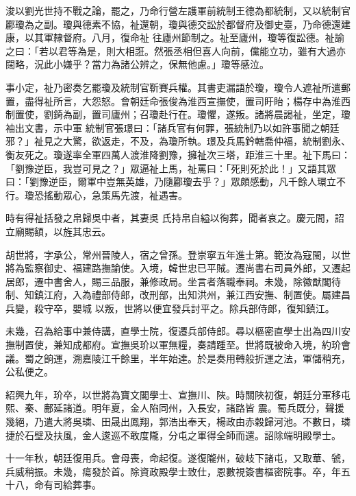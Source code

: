 \begin{pinyinscope}
 浚以劉光世持不戰之論，罷之，乃命行營左護軍前統制王德為都統制，又以統制官酈瓊為之副。瓊與德素不協，祉還朝，瓊與德交訟於都督府及御史臺，乃命德還建康，以其軍隸督府。八月，復命祉
 往廬州節制之。祉至廬州，瓊等復訟德。祉諭之曰：「若以君等為是，則大相誑。然張丞相但喜人向前，儻能立功，雖有大過亦闊略，況此小嫌乎？當力為諸公辨之，保無他慮。」瓊等感泣。



 事小定，祉乃密奏乞罷瓊及統制官靳賽兵權。其書吏漏語於瓊，瓊令人遮祉所遣郵置，盡得祉所言，大怨怒。會朝廷命張俊為淮西宣撫使，置司盱眙；楊存中為淮西制置使，劉錡為副，置司廬州；召瓊赴行在。瓊懼，遂叛。諸將晨謁祉，坐定，瓊袖出文書，示中軍
 統制官張璟曰：「諸兵官有何罪，張統制乃以如許事聞之朝廷邪？」祉見之大驚，欲返走，不及，為瓊所執。璟及兵馬鈐轄喬仲福，統制劉永、衡友死之。瓊遂率全軍四萬人渡淮降劉豫，擁祉次三塔，距淮三十里。祉下馬曰：「劉豫逆臣，我豈可見之？」眾逼祉上馬，祉罵曰：「死則死於此！」又語其眾曰：「劉豫逆臣，爾軍中豈無英雄，乃隨酈瓊去乎？」眾頗感動，凡千餘人環立不行。瓊恐搖動眾心，急策馬先渡，祉遇害。



 時有得祉括發之帛歸吳中者，其妻吳
 氏持帛自縊以徇葬，聞者哀之。慶元間，詔立廟賜額，以旌其忠云。



 胡世將，字承公，常州晉陵人，宿之曾孫。登崇寧五年進士第。範汝為寇閩，以世將為監察御史、福建路撫諭使。入境，韓世忠已平賊。遷尚書右司員外郎，又遷起居郎，遷中書舍人，賜三品服，兼修政局。坐言者落職奉祠。未幾，除徽猷閣待制、知鎮江府，入為禮部侍郎，改刑部，出知洪州，兼江西安撫、制置使。屬建昌兵變，殺守卒，嬰城
 以叛，世將以便宜發兵討平之。除兵部侍郎，復知鎮江。



 未幾，召為給事中兼侍講，直學士院，復遷兵部侍郎。尋以樞密直學士出為四川安撫制置使，兼知成都府。宣撫吳玠以軍無糧，奏請踵至。世將既被命入境，約玠會議。蜀之餉運，溯嘉陵江千餘里，半年始達。於是奏用轉般折運之法，軍儲稍充，公私便之。



 紹興九年，玠卒，以世將為寶文閣學士、宣撫川、陜。時關陜初復，朝廷分軍移屯熙、秦、鄜延諸道。明年夏，金人陷同州，入長安，諸路皆
 震。蜀兵既分，聲援幾絕，乃遣大將吳璘、田晟出鳳翔，郭浩出奉天，楊政由赤穀歸河池。不數日，璘捷於石壁及扶風，金人逡巡不敢度隴，分屯之軍得全師而還。詔除端明殿學士。



 十一年秋，朝廷復用兵。會母喪，命起復。遂復隴州，破岐下諸屯，又取華、虢，兵威稍振。未幾，瘍發於首。除資政殿學士致仕，恩數視簽書樞密院事。卒，年五十八，命有司給葬事。




\end{pinyinscope}
